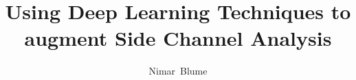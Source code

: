\documentclass[journal]{IEEEtran}
\makeatletter
\def\markboth#1#2{\def\leftmark{\@IEEEcompsoconly{\sffamily}\MakeUppercase{\protect#1}}%
\def\rightmark{\@IEEEcompsoconly{\sffamily}\MakeUppercase{\protect#2}}}
\makeatother
\begin{document}
\title{Using Deep Learning Techniques to augment Side Channel Analysis}
%
%

\author{Nimar~Blume}%

% 
%

\markboth{Advanced Seminar for Security in Information Technology, Summer Term 2017}%
{Nimar Blume: Using Deep Learning Techniques to augment Side Channel Analysis}

% 
\end{document}
